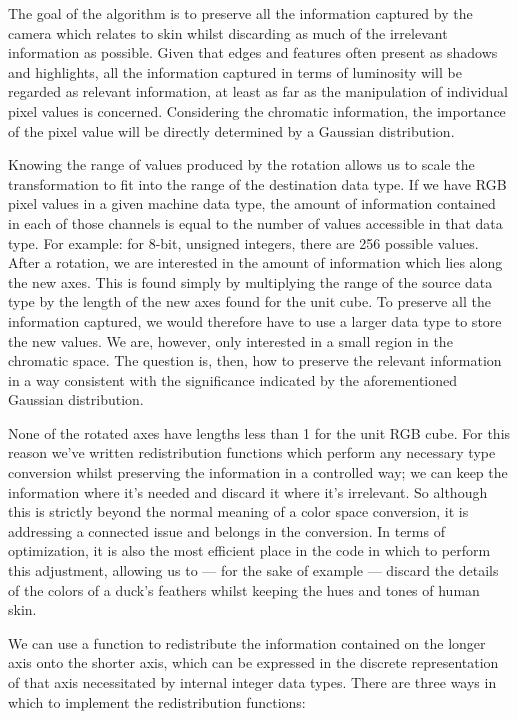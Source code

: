 The goal of the algorithm is to preserve all the information captured by the camera which relates to skin whilst discarding as much of the irrelevant information as possible. Given that edges and features often present as shadows and highlights, all the information captured in terms of luminosity will be regarded as relevant information, at least as far as the manipulation of individual pixel values is concerned. Considering the chromatic information, the importance of the pixel value will be directly determined by a Gaussian distribution.

Knowing the range of values produced by the rotation allows us to scale the transformation to fit into the range of the destination data type. If we have RGB pixel values in a given machine data type, the amount of information contained in each of those channels is equal to the number of values accessible in that data type. For example: for 8-bit, unsigned integers, there are 256 possible values. After a rotation, we are interested in the amount of information which lies along the new axes. This is found simply by multiplying the range of the source data type by the length of the new axes found for the unit cube. To preserve all the information captured, we would therefore have to use a larger data type to store the new values. We are, however, only interested in a small region in the chromatic space. The question is, then, how to preserve the relevant information in a way consistent with the significance indicated by the aforementioned Gaussian distribution.


None of the rotated axes have lengths less than 1 for the unit RGB cube. For this reason we've written redistribution functions which perform any necessary type conversion whilst preserving the information in a controlled way; we can keep the information where it's needed and discard it where it's irrelevant. So although this is strictly beyond the normal meaning of a color space conversion, it is addressing a connected issue and belongs in the conversion. In terms of optimization, it is also the most efficient place in the code in which to perform this adjustment, allowing us to --- for the sake of example --- discard the details of the colors of a duck's feathers whilst keeping the hues and tones of human skin.

We can use a function to redistribute the information contained on the longer axis onto the shorter axis, which can be expressed in the discrete representation of that axis necessitated by internal integer data types. There are three ways in which to implement the redistribution functions:

